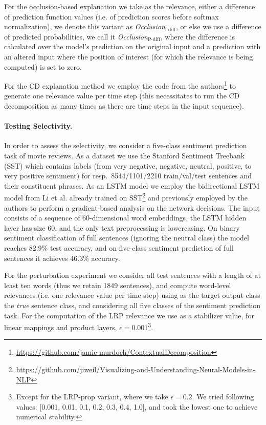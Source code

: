 \documentclass[runningheads]{llncs}
\begin{document}
For the occlusion-based explanation we take as the relevance, either a difference of prediction function values (i.e. of prediction scores before softmax normalization), we denote this variant as {\it Occlusion}$_\text{f-diff}$, or else we use a difference of predicted probabilities, we call it {\it Occlusion}$_\text{P-diff}$, where the difference is calculated over the model's prediction on the original input and a prediction with an altered input where the position of interest (for which the relevance is being computed) is set to zero.

For the CD explanation method \cite{Arr:Murdoch:ICLR2018} we employ the code from the authors\footnote{\url{https://github.com/jamie-murdoch/ContextualDecomposition}} to generate one relevance value per time step (this necessitates to run the CD decomposition as many times as there are time steps in the input sequence).

\paragraph{Testing Selectivity.}
In order to assess the selectivity, we consider a five-class sentiment prediction task of movie reviews.
As a dataset we use the Stanford Sentiment Treebank (SST) \cite{Arr:Socher:EMNLP2013} which contains labels (from very negative, negative, neutral, positive, to very positive sentiment) for resp.\ 8544/1101/2210 train/val/test sentences and their constituent phrases.
As an LSTM model we employ the bidirectional LSTM model from Li et al. \cite{Arr:Li:NAACL2016} already trained on SST\footnote{\url{https://github.com/jiweil/Visualizing-and-Understanding-Neural-Models-in-NLP}} and previously employed by the authors to perform a gradient-based analysis on the network decisions.
The input consists of a sequence of 60-dimensional word embeddings, the LSTM hidden layer has size 60, and the only text preprocessing is lowercasing. 
On binary sentiment classification of full sentences (ignoring the neutral class) the model reaches 82.9\% test accuracy, and on five-class sentiment prediction of full sentences it achieves 46.3\% accuracy.

For the perturbation experiment we consider all test sentences with a length of at least ten words (thus we retain 1849 sentences), 
and compute word-level relevances (i.e. one relevance value per time step) using as the target output class the {\it true} sentence class, and considering all five classes of the sentiment prediction task.
For the computation of the LRP relevance we use as a stabilizer value, for linear mappings and product layers, $\epsilon=0.001$\footnote{Except for the LRP-prop variant, where we take $\epsilon=0.2$. We tried following values: [0.001, 0.01, 0.1, 0.2, 0.3, 0.4, 1.0], and took the lowest one to achieve numerical stability.}.
\end{document}
